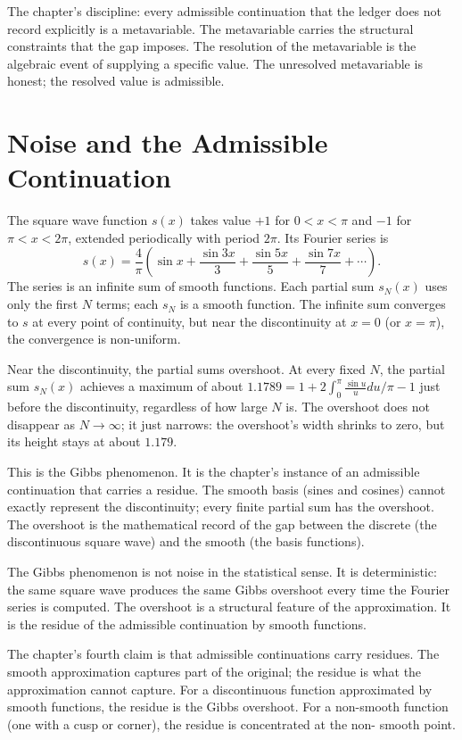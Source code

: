 The chapter's discipline: every admissible continuation that the
ledger does not record explicitly is a metavariable. The
metavariable carries the structural constraints that the gap
imposes. The resolution of the metavariable is the algebraic
event of supplying a specific value. The unresolved metavariable
is honest; the resolved value is admissible.

\section{Noise and the Admissible Continuation}
\label{se:noise-and-the-admissible-continuation}

The square wave function $s(x)$ takes value $+1$ for $0 < x < \pi$ and
$-1$ for $\pi < x < 2\pi$, extended periodically with period $2\pi$.
Its Fourier series is
\[
s(x) = \frac{4}{\pi}\left(\sin x + \frac{\sin 3x}{3} + \frac{\sin 5x}{5}
+ \frac{\sin 7x}{7} + \cdots\right).
\]
The series is an infinite sum of smooth functions. Each partial sum
$s_N(x)$ uses only the first $N$ terms; each $s_N$ is a smooth
function. The infinite sum converges to $s$ at every point of
continuity, but near the discontinuity at $x = 0$ (or $x = \pi$),
the convergence is non-uniform.

Near the discontinuity, the partial sums overshoot. At every fixed
$N$, the partial sum $s_N(x)$ achieves a maximum of about
$1.1789 = 1 + 2\int_0^\pi \frac{\sin u}{u} du / \pi - 1$ just before
the discontinuity, regardless of how large $N$ is. The overshoot does
not disappear as $N \to \infty$; it just narrows: the overshoot's
width shrinks to zero, but its height stays at about $1.179$.

This is the Gibbs phenomenon. It is the chapter's instance of an
admissible continuation that carries a residue. The smooth basis
(sines and cosines) cannot exactly represent the discontinuity;
every finite partial sum has the overshoot. The overshoot is the
mathematical record of the gap between the discrete (the
discontinuous square wave) and the smooth (the basis functions).

The Gibbs phenomenon is not noise in the statistical sense. It is
deterministic: the same square wave produces the same Gibbs
overshoot every time the Fourier series is computed. The
overshoot is a structural feature of the approximation. It is the
residue of the admissible continuation by smooth functions.

The chapter's fourth claim is that admissible continuations carry
residues. The smooth approximation captures part of the original;
the residue is what the approximation cannot capture. For a
discontinuous function approximated by smooth functions, the
residue is the Gibbs overshoot. For a non-smooth function (one
with a cusp or corner), the residue is concentrated at the non-
smooth point.

